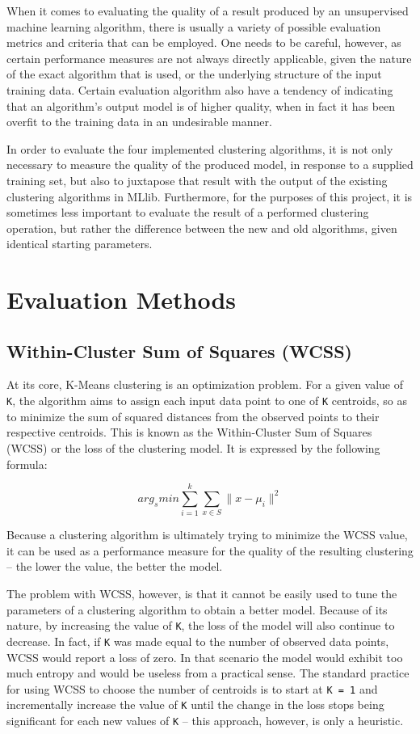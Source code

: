 \documentclass{l4proj}
\begin{document}
When it comes to evaluating the quality of a result produced by an unsupervised machine learning algorithm, there is usually a variety of possible evaluation metrics and criteria that can be employed. One needs to be careful, however, as certain performance measures are not always directly applicable, given the nature of the exact algorithm that is used, or the underlying structure of the input training data. Certain evaluation algorithm also have a tendency of indicating that an algorithm's output model is of higher quality, when in fact it has been overfit to the training data in an undesirable manner\cite{Overfit}.

In order to evaluate the four implemented clustering algorithms, it is not only necessary to measure the quality of the produced model, in response to a supplied training set, but also to juxtapose that result with the output of the existing clustering algorithms in MLlib. Furthermore, for the purposes of this project, it is sometimes less important to evaluate the result of a performed clustering operation, but rather the difference between the new and old algorithms, given identical starting parameters. 

\section{Evaluation Methods}

\subsection{Within-Cluster Sum of Squares (WCSS)}

At its core, K-Means clustering is an optimization problem. For a given value of \texttt{K}, the algorithm aims to assign each input data point to one of \texttt{K} centroids, so as to minimize the sum of squared distances from the observed points to their respective centroids. This is known as the Within-Cluster Sum of Squares (WCSS) or the loss of the clustering model. It is expressed by the following formula:

$$arg_{s} min \sum_{i=1}^{k}\sum_{x \in S} \|x - \mu_{i} \|^{2}$$

\noindent Because a clustering algorithm is ultimately trying to minimize the WCSS value, it can be used as a performance measure for the quality of the resulting clustering -- the lower the value, the better the model.

The problem with WCSS, however, is that it cannot be easily used to tune the parameters of a clustering algorithm to obtain a better model. Because of its nature, by increasing the value of \texttt{K}, the loss of the model will also continue to decrease. In fact, if \texttt{K} was made equal to the number of observed data points, WCSS would report a loss of zero. In that scenario the model would exhibit too much entropy and would be useless from a practical sense. The standard practice for using WCSS to choose the number of centroids is to start at \texttt{K = 1} and incrementally increase the value of \texttt{K} until the change in the loss stops being significant for each new values of \texttt{K} -- this approach, however, is only a heuristic.
\end{document}
